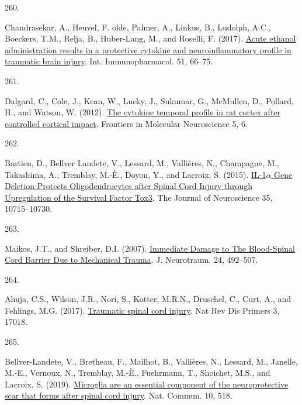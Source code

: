 \documentclass[
]{article}
\newlength{\cslhangindent}
\newlength{\csllabelwidth}
\newlength{\cslentryspacingunit} %
\newenvironment{CSLReferences}[2] %
 {%
  \setlength{\parindent}{0pt}
  \ifodd #1
  \let\oldpar\par
  \def\par{\hangindent=\cslhangindent\oldpar}
  \fi
  \setlength{\parskip}{#2\cslentryspacingunit}
 }%
 {}
\newcommand{\CSLLeftMargin}[1]{\parbox[t]{\csllabelwidth}{#1}}
\newcommand{\CSLRightInline}[1]{\parbox[t]{\linewidth - \csllabelwidth}{#1}\break}
\begin{document}
\begin{CSLReferences}{0}{0}
\leavevmode{}%
\CSLLeftMargin{260. }
\CSLRightInline{Chandrasekar, A., Heuvel, F. olde, Palmer, A., Linkus, B., Ludolph, A.C., Boeckers, T.M., Relja, B., Huber-Lang, M., and Roselli, F. (2017). \href{https://doi.org/10.1016/j.intimp.2017.08.002}{Acute ethanol administration results in a protective cytokine and neuroinflammatory profile in traumatic brain injury}. Int. Immunopharmacol. 51, 66--75.}

\leavevmode{}%
\CSLLeftMargin{261. }
\CSLRightInline{Dalgard, C., Cole, J., Kean, W., Lucky, J., Sukumar, G., McMullen, D., Pollard, H., and Watson, W. (2012). \href{https://doi.org/10.3389/fnmol.2012.00006}{The cytokine temporal profile in rat cortex after controlled cortical impact}. Frontiers in Molecular Neuroscience 5, 6.}

\leavevmode{}%
\CSLLeftMargin{262. }
\CSLRightInline{Bastien, D., Bellver Landete, V., Lessard, M., Vallières, N., Champagne, M., Takashima, A., Tremblay, M.-È., Doyon, Y., and Lacroix, S. (2015). \href{https://doi.org/10.1523/JNEUROSCI.0498-15.2015}{{IL-1\(\alpha\) Gene Deletion Protects Oligodendrocytes} after {Spinal Cord Injury} through {Upregulation} of the {Survival Factor Tox3}}. The Journal of Neuroscience 35, 10715--10730.}

\leavevmode{}%
\CSLLeftMargin{263. }
\CSLRightInline{Maikos, J.T., and Shreiber, D.I. (2007). \href{https://doi.org/10.1089/neu.2006.0149}{Immediate {Damage} to {The Blood-Spinal Cord Barrier Due} to {Mechanical Trauma}}. J. Neurotraum. 24, 492--507.}

\leavevmode{}%
\CSLLeftMargin{264. }
\CSLRightInline{Ahuja, C.S., Wilson, J.R., Nori, S., Kotter, M.R.N., Druschel, C., Curt, A., and Fehlings, M.G. (2017). \href{https://doi.org/10.1038/nrdp.2017.18}{Traumatic spinal cord injury}. Nat Rev Dis Primers 3, 17018.}

\leavevmode{}%
\CSLLeftMargin{265. }
\CSLRightInline{Bellver-Landete, V., Bretheau, F., Mailhot, B., Vallières, N., Lessard, M., Janelle, M.-E., Vernoux, N., Tremblay, M.-È., Fuehrmann, T., Shoichet, M.S., and Lacroix, S. (2019). \href{https://doi.org/10.1038/s41467-019-08446-0}{Microglia are an essential component of the neuroprotective scar that forms after spinal cord injury}. Nat. Commun. 10, 518.}


\end{CSLReferences}
\end{document}
